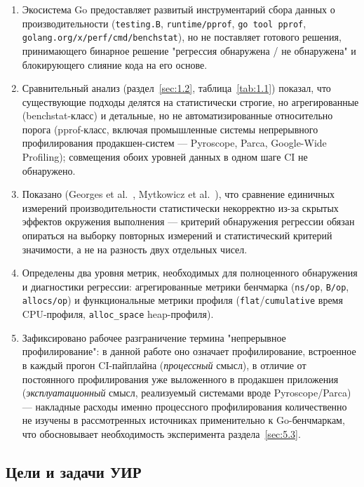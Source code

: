 \documentclass[12pt,a4paper]{article}
\numberwithin{equation}{section}
\begin{document}
\begin{enumerate}
\item Экосистема Go предоставляет развитый инструментарий сбора данных о
производительности (\texttt{testing.B}, \texttt{runtime/\allowbreak pprof},
\texttt{go tool pprof}, \texttt{golang.org/\allowbreak x/\allowbreak perf/\allowbreak cmd/\allowbreak benchstat}), но не
поставляет готового решения, принимающего бинарное решение "регрессия
обнаружена / не обнаружена" и блокирующего слияние кода на его основе.
\item Сравнительный анализ (раздел~\ref{sec:1.2}, таблица~\ref{tab:1.1})
показал, что существующие подходы делятся на статистически строгие, но
агрегированные (benchstat-класс) и детальные, но не автоматизированные
относительно порога (pprof-класс, включая промышленные системы
непрерывного профилирования продакшен-систем — Pyroscope, Parca,
Google-Wide Profiling); совмещения обоих уровней данных в одном шаге CI не
обнаружено.
\item Показано (Georges et al.~\cite{georges2007}, Mytkowicz et
al.~\cite{mytkowicz2009}), что сравнение единичных измерений
производительности статистически некорректно из-за скрытых эффектов
окружения выполнения — критерий обнаружения регрессии обязан опираться на
выборку повторных измерений и статистический критерий значимости, а не на
разность двух отдельных чисел.
\item Определены два уровня метрик, необходимых для полноценного
обнаружения и диагностики регрессии: агрегированные метрики бенчмарка
(\texttt{ns/\allowbreak op}, \texttt{B/\allowbreak op}, \texttt{allocs/\allowbreak op}) и функциональные метрики
профиля (\texttt{flat}/\texttt{cumulative} время CPU-профиля,
\texttt{alloc\_space} heap-профиля).
\item Зафиксировано рабочее разграничение термина "непрерывное
профилирование": в данной работе оно означает профилирование, встроенное в
каждый прогон CI-пайплайна (\emph{процессный} смысл), в отличие от
постоянного профилирования уже выложенного в продакшен приложения
(\emph{эксплуатационный} смысл, реализуемый системами вроде Pyroscope/Parca)
— накладные расходы именно процессного профилирования количественно не
изучены в рассмотренных источниках применительно к Go-бенчмаркам, что
обосновывает необходимость эксперимента раздела~\ref{sec:5.3}.
\end{enumerate}

\subsection{Цели и задачи УИР}
\end{document}
